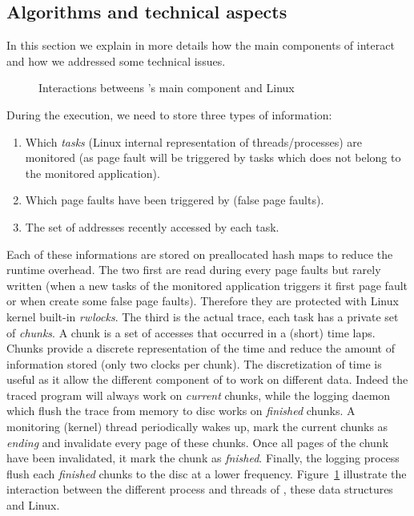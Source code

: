 \subsection{Algorithms and technical aspects}
\label{sec:design-tech}

In this section we explain in more details how the main components of \Moca
interact and how we addressed some technical issues.

\begin{figure}[htb]
    \centering
    \caption{Interactions betweens \Moca's main component and Linux}
    \label{fig:moca}
\end{figure}


During the execution, we need to store three types of information:
\begin{enumerate}
    \item Which \emph{tasks} (Linux internal representation of threads/processes) are
monitored (as page fault will be triggered by tasks which does not belong to
the monitored application).
    \item Which page faults have been triggered by \Moca (false page faults).
    \item The set of addresses recently accessed by each task.
\end{enumerate}

Each of these informations are stored on preallocated hash maps to reduce the
runtime overhead.  The two first are read during every page faults but rarely
written (when a new tasks of the monitored application triggers it first page
fault or when \Moca create some false page faults). Therefore they are
protected with Linux kernel built-in \emph{rwlocks}. The third is the actual
trace, each task has a private set of \emph{chunks}. A chunk is a set of
accesses that occurred in a (short) time laps.  Chunks provide a discrete
representation of the time and reduce the amount of information stored (only
two clocks per chunk). The discretization of time is useful as it allow the
different component of \Moca to work on different data.  Indeed the traced
program will always work on \emph{current} chunks, while the logging daemon
which flush the trace from memory to disc works on \emph{finished} chunks. A
monitoring (kernel) thread periodically wakes up, mark the current chunks as
\emph{ending} and invalidate every page of these chunks. Once all pages of the
chunk have been invalidated, it mark the chunk as \emph{fnished}. Finally, the
logging process flush each \emph{finished} chunks to the disc at a lower
frequency.  Figure~\ref{fig:moca} illustrate the interaction between the
different process and threads of \Moca, these data structures and Linux.

